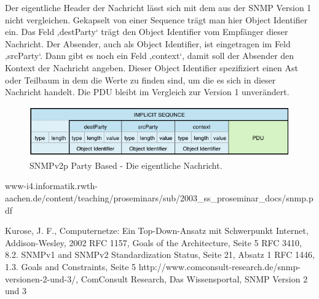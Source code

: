 \documentclass[11pt,a4paper]{article}
\begin{document}
Der eigentliche Header der Nachricht lässt sich mit dem aus der SNMP Version 1 nicht vergleichen. Gekapselt von einer Sequence trägt man hier Object Identifier ein. Das Feld ‚destParty‘ trägt den Object Identifier vom Empfänger dieser Nachricht. Der Absender, auch als Object Identifier, ist eingetragen im Feld ‚srcParty‘. Dann gibt es noch ein Feld ‚context‘, damit soll der Absender den Kontext der Nachricht angeben. Dieser Object Identifier spezifiziert einen Ast oder Teilbaum in dem die Werte zu finden sind, um die es sich in dieser Nachricht handelt. Die PDU bleibt im Vergleich zur Version 1 unverändert.\\
\begin{figure}[h]
	\centering
	\includegraphics[scale=.8]{Bilder/SNMPv2p-Message}
	\caption{SNMPv2p Party Based - Die eigentliche Nachricht.}
\end{figure}

\pagebreak
\begin{thebibliography}{10}
	\begin{small}
		www-i4.informatik.rwth-aachen.de/content/teaching/proseminars/sub/2003\_ss\_proseminar\_docs/snmp.pdf
	\end{small}
		Kurose, J. F.,
		Computernetze: Ein Top-Down-Ansatz mit Schwerpunkt Internet,
		Addison-Wesley,
		2002
		RFC 1157, Goals of the Architecture, Seite 5
		RFC 3410, 8.2.  SNMPv1 and SNMPv2 Standardization Status, Seite 21, Absatz 1
		RFC 1446, 1.3.  Goals and Constraints, Seite 5
		http://www.comconsult-research.de/snmp-versionen-2-und-3/,
		ComConsult Research, Das Wissensportal, SNMP Version 2 und 3
\end{thebibliography}
\end{document}
